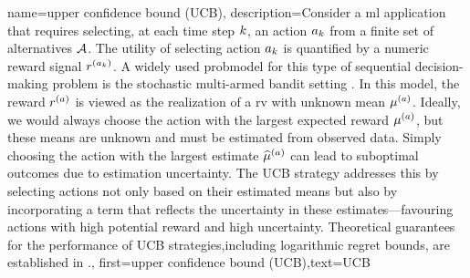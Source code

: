 {name={upper confidence bound (UCB)},
	description={Consider a \gls{ml} 
		application that requires selecting, at each time step $k$, an action $a_{k}$ 
		from a finite set of alternatives $\mathcal{A}$. The utility of selecting action $a_{k}$ 
		is quantified by a numeric \gls{reward} signal $r^{(a_{k})}$. 
		A widely used \gls{probmodel} for this type of sequential decision-making problem 
		is the stochastic multi-armed bandit setting \cite{Bubeck2012}. In this model, 
		the reward $r^{(a)}$ is viewed as the \gls{realization} of a \gls{rv} 
		with unknown \gls{mean} $\mu^{(a)}$. Ideally, we would always choose the 
		action with the largest expected \gls{reward} $\mu^{(a)}$, but these 
		means are unknown and must be estimated from observed \gls{data}. Simply 
		choosing the action with the largest estimate $\widehat{\mu}^{(a)}$ can 
		lead to suboptimal outcomes due to estimation uncertainty. The UCB strategy 
		addresses this by selecting actions not only based on their estimated means but 
		also by incorporating a term that reflects the uncertainty in these estimates—favouring 
		actions with high potential reward and high uncertainty. Theoretical guarantees 
		for the performance of UCB strategies,including logarithmic regret bounds, are established in \cite{Bubeck2012}.},
	first={upper confidence bound (UCB)},text={UCB} 
}

